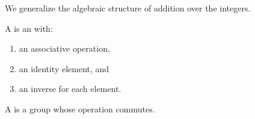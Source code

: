
\sbasic



\sstart



We generalize the algebraic structure of
addition over the integers.


A  is an
 with:

\begin{enumerate}
  \item
  an associative operation,

  \item
  an identity element, and

  \item
  an inverse for each element.
\end{enumerate}

A 
is a group whose operation commutes.



\strats
